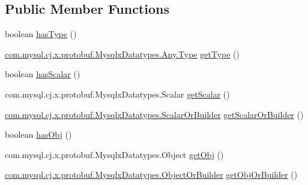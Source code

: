 \subsection*{Public Member Functions}
\begin{DoxyCompactItemize}
\item 
boolean \mbox{\hyperlink{interfacecom_1_1mysql_1_1cj_1_1x_1_1protobuf_1_1_mysqlx_datatypes_1_1_any_or_builder_a432d597e73938ff5d3153af19dec1512}{has\+Type}} ()
\item 
\mbox{\hyperlink{enumcom_1_1mysql_1_1cj_1_1x_1_1protobuf_1_1_mysqlx_datatypes_1_1_any_1_1_type}{com.\+mysql.\+cj.\+x.\+protobuf.\+Mysqlx\+Datatypes.\+Any.\+Type}} \mbox{\hyperlink{interfacecom_1_1mysql_1_1cj_1_1x_1_1protobuf_1_1_mysqlx_datatypes_1_1_any_or_builder_a1361722d55f0492e8698fb7e037f1074}{get\+Type}} ()
\item 
boolean \mbox{\hyperlink{interfacecom_1_1mysql_1_1cj_1_1x_1_1protobuf_1_1_mysqlx_datatypes_1_1_any_or_builder_a1966856256227964263f84feb942e534}{has\+Scalar}} ()
\item 
com.\+mysql.\+cj.\+x.\+protobuf.\+Mysqlx\+Datatypes.\+Scalar \mbox{\hyperlink{interfacecom_1_1mysql_1_1cj_1_1x_1_1protobuf_1_1_mysqlx_datatypes_1_1_any_or_builder_a181a76f3e55086e30db876500288e64f}{get\+Scalar}} ()
\item 
\mbox{\hyperlink{interfacecom_1_1mysql_1_1cj_1_1x_1_1protobuf_1_1_mysqlx_datatypes_1_1_scalar_or_builder}{com.\+mysql.\+cj.\+x.\+protobuf.\+Mysqlx\+Datatypes.\+Scalar\+Or\+Builder}} \mbox{\hyperlink{interfacecom_1_1mysql_1_1cj_1_1x_1_1protobuf_1_1_mysqlx_datatypes_1_1_any_or_builder_a0cef4bf7b09cc44d83ba60dc2fecbf5d}{get\+Scalar\+Or\+Builder}} ()
\item 
boolean \mbox{\hyperlink{interfacecom_1_1mysql_1_1cj_1_1x_1_1protobuf_1_1_mysqlx_datatypes_1_1_any_or_builder_a37f4fa93114aa7fd3228469d9414038c}{has\+Obj}} ()
\item 
com.\+mysql.\+cj.\+x.\+protobuf.\+Mysqlx\+Datatypes.\+Object \mbox{\hyperlink{interfacecom_1_1mysql_1_1cj_1_1x_1_1protobuf_1_1_mysqlx_datatypes_1_1_any_or_builder_a7e245272e6729ec9861ed03053c7fb51}{get\+Obj}} ()
\item 
\mbox{\hyperlink{interfacecom_1_1mysql_1_1cj_1_1x_1_1protobuf_1_1_mysqlx_datatypes_1_1_object_or_builder}{com.\+mysql.\+cj.\+x.\+protobuf.\+Mysqlx\+Datatypes.\+Object\+Or\+Builder}} \mbox{\hyperlink{interfacecom_1_1mysql_1_1cj_1_1x_1_1protobuf_1_1_mysqlx_datatypes_1_1_any_or_builder_aeaec3215be11d7f0afd0eb72b222cae8}{get\+Obj\+Or\+Builder}} ()
\item 

\end{DoxyCompactItemize}
